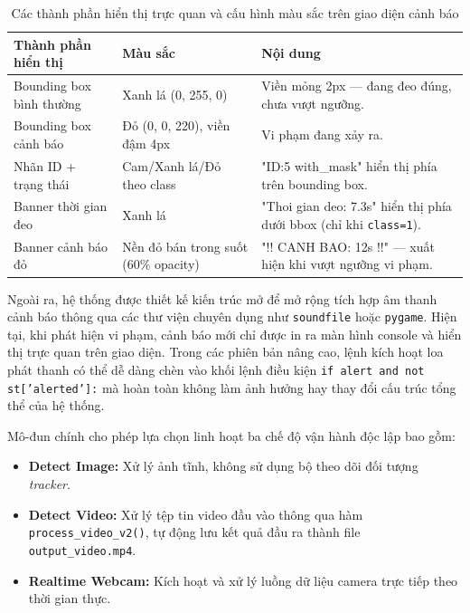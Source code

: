 \documentclass[a4paper,12pt]{article}
\begin{document}
\begin{table}[H]
\centering
\caption{Các thành phần hiển thị trực quan và cấu hình màu sắc trên giao diện cảnh báo}
\label{tab:alert_ui_config}
\renewcommand{\arraystretch}{1.5} 
\begin{tabularx}{\textwidth}{|>{\raggedright\arraybackslash}p{4.5cm}|>{\raggedright\arraybackslash}p{4.5cm}|>{\raggedright\arraybackslash}X|}
\hline
\rowcolor{headerblue} 
\textbf{\color{white}Thành phần hiển thị} & \textbf{\color{white}Màu sắc} & \textbf{\color{white}Nội dung} \\ \hline
Bounding box bình thường & Xanh lá (0, 255, 0) & Viền mỏng 2px --- đang đeo đúng, chưa vượt ngưỡng. \\ \hline
Bounding box cảnh báo & Đỏ (0, 0, 220), viền đậm 4px & Vi phạm đang xảy ra. \\ \hline
Nhãn ID + trạng thái & Cam/Xanh lá/Đỏ theo class & "ID:5 with\_mask" hiển thị phía trên bounding box. \\ \hline
Banner thời gian đeo & Xanh lá & "Thoi gian deo: 7.3s" hiển thị phía dưới bbox (chỉ khi \texttt{class=1}). \\ \hline
Banner cảnh báo đỏ & Nền đỏ bán trong suốt (60\% opacity) & "!! CANH BAO: 12s !!" --- xuất hiện khi vượt ngưỡng vi phạm. \\ \hline
\end{tabularx}
\end{table}

Ngoài ra, hệ thống được thiết kế kiến trúc mở để mở rộng tích hợp âm thanh cảnh báo thông qua các thư viện chuyên dụng như \texttt{soundfile} hoặc \texttt{pygame}. Hiện tại, khi phát hiện vi phạm, cảnh báo mới chỉ được in ra màn hình console và hiển thị trực quan trên giao diện. Trong các phiên bản nâng cao, lệnh kích hoạt loa phát thanh có thể dễ dàng chèn vào khối lệnh điều kiện \texttt{if alert and not st['alerted']:} mà hoàn toàn không làm ảnh hưởng hay thay đổi cấu trúc tổng thể của hệ thống.

Mô-đun chính cho phép lựa chọn linh hoạt ba chế độ vận hành độc lập bao gồm:

\begin{itemize}
    \item \textbf{Detect Image:} Xử lý ảnh tĩnh, không sử dụng bộ theo dõi đối tượng \textit{tracker}.
    \item \textbf{Detect Video:} Xử lý tệp tin video đầu vào thông qua hàm \texttt{process\_video\_v2()}, tự động lưu kết quả đầu ra thành file \texttt{output\_video.mp4}.
    \item \textbf{Realtime Webcam:} Kích hoạt và xử lý luồng dữ liệu camera trực tiếp theo thời gian thực.
\end{itemize}
\end{document}
